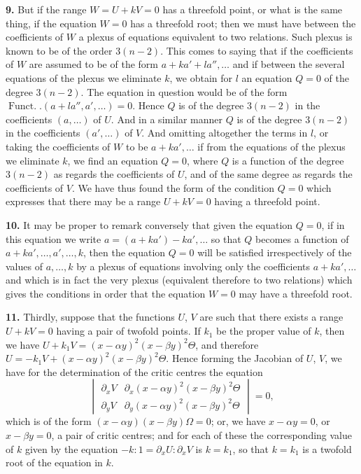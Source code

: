 \documentclass[11pt,a4paper]{article}
\providecommand{\Funct}{\operatorname{Funct.}}
\begin{document}
\medskip

\textbf{9.} But if the range $W = U + kV = 0$ has a threefold point, or what is the same thing, if the equation $W = 0$ has a threefold root; then we must have between the coefficients of $W$ a plexus of equations equivalent to two relations. Such plexus is known to be of the order $3(n - 2)$. This comes to saying that if the coefficients of $W$ are assumed to be of the form $a + ka' + la'', \ldots$ and if between the several equations of the plexus we eliminate $k$, we obtain for $l$ an equation $Q = 0$ of the degree $3(n - 2)$. The equation in question would be of the form $\Funct.(a + la'', a', \ldots) = 0$. Hence $Q$ is of the degree $3(n - 2)$ in the coefficients $(a, \ldots)$ of $U$. And in a similar manner $Q$ is of the degree $3(n - 2)$ in the coefficients $(a', \ldots)$ of $V$. And omitting altogether the terms in $l$, or taking the coefficients of $W$ to be $a + ka', \ldots$ if from the equations of the plexus we eliminate $k$, we find an equation $Q = 0$, where $Q$ is a function of the degree $3(n - 2)$ as regards the coefficients of $U$, and of the same degree as regards the coefficients of $V$. We have thus found the form of the condition $Q = 0$ which expresses that there may be a range $U + kV = 0$ having a threefold point.

\medskip

\textbf{10.} It may be proper to remark conversely that given the equation $Q = 0$, if in this equation we write $a = (a + ka') - ka', \ldots$ so that $Q$ becomes a function of $a + ka', \ldots, a', \ldots, k$, then the equation $Q = 0$ will be satisfied irrespectively of the values of $a, \ldots, k$ by a plexus of equations involving only the coefficients $a + ka', \ldots$ and which is in fact the very plexus (equivalent therefore to two relations) which gives the conditions in order that the equation $W = 0$ may have a threefold root.

\medskip

\textbf{11.} Thirdly, suppose that the functions $U$, $V$ are such that there exists a range $U + kV = 0$ having a pair of twofold points. If $k_1$ be the proper value of $k$, then we have $U + k_1 V = (x - \alpha y)^2 (x - \beta y)^2 \Theta$, and therefore $U = -k_1 V + (x - \alpha y)^2 (x - \beta y)^2 \Theta$. Hence forming the Jacobian of $U$, $V$, we have for the determination of the critic centres the equation
\[
\begin{vmatrix} \partial_x V & \partial_x (x - \alpha y)^2 (x - \beta y)^2 \Theta\\ \partial_y V & \partial_y (x - \alpha y)^2 (x - \beta y)^2 \Theta\end{vmatrix} = 0,
\]
which is of the form $(x - \alpha y)(x - \beta y)\Omega = 0$; or, we have $x - \alpha y = 0$, or $x - \beta y = 0$, a pair of critic centres; and for each of these the corresponding value of $k$ given by the equation $-k : 1 = \partial_x U : \partial_x V$ is $k = k_1$, so that $k = k_1$ is a twofold root of the equation in $k$.
\end{document}
